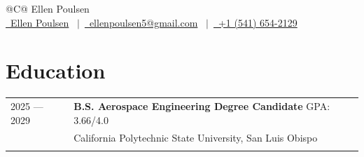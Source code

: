 \documentclass[a4paper,12pt]{article}
\begin{document}
\pagestyle{empty}


\begin{tabularx}{\linewidth}{@{}C@{}}
  \Huge{Ellen Poulsen} \\[7.5pt]
  \href{https://linkedin.com/in/ellenpoulsen07}{\raisebox{-0.05\height}\faLinkedin\ Ellen Poulsen}
  \ $|$\ 
  \href{mailto:ellenpoulsen5@gmail.com}{\raisebox{-0.05\height}\faEnvelope\ ellenpoulsen5@gmail.com}
  \ $|$\ 
  \href{tel:+15416542129}{\raisebox{-0.05\height}\faMobile\ +1 (541) 654-2129} \\
\end{tabularx}


\section{Education} 
\begin{tabularx}{\linewidth}{@{}l X@{}} 
2025 --- 2029 & \textbf{B.S. Aerospace Engineering Degree Candidate} \hfill GPA: 3.66/4.0 \\ 
                 & California Polytechnic State University, San Luis Obispo \\ 
\noalign{\vspace{0.5ex}}
\end{tabularx}



\end{document}
